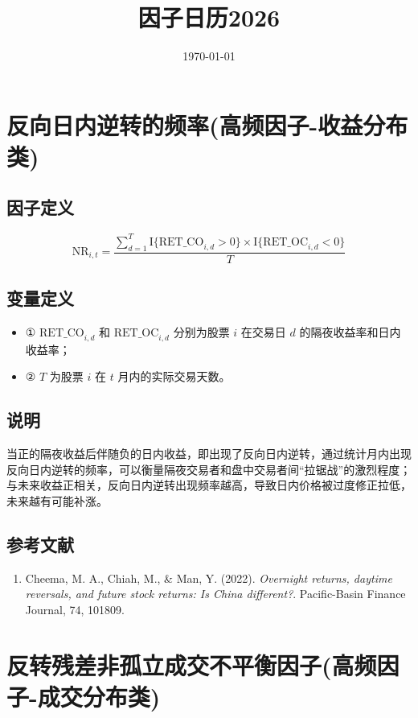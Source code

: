 \documentclass{article}
\title{因子日历2026}
\date{\today}
\begin{document}
\maketitle

\section{反向日内逆转的频率(高频因子-收益分布类)}

\subsection{因子定义}
\begin{equation}
    \mathrm{NR}_{i,t} = \frac{\sum_{d=1}^{T} \mathrm{I}\{\mathrm{RET\_CO}_{i,d}>0\} \times \mathrm{I}\{\mathrm{RET\_OC}_{i,d}<0\}}{T}
\end{equation}

\subsection{变量定义}
\begin{itemize}
    \item ① \( \mathrm{RET\_CO}_{i,d} \) 和 \( \mathrm{RET\_OC}_{i,d} \) 分别为股票 \( i \) 在交易日 \( d \) 的隔夜收益率和日内收益率；
    \item ② \( T \) 为股票 \( i \) 在 \( t \) 月内的实际交易天数。
\end{itemize}

\subsection{说明}
当正的隔夜收益后伴随负的日内收益，即出现了反向日内逆转，通过统计月内出现反向日内逆转的频率，可以衡量隔夜交易者和盘中交易者间“拉锯战”的激烈程度；与未来收益正相关，反向日内逆转出现频率越高，导致日内价格被过度修正拉低，未来越有可能补涨。

\subsection{参考文献}
\begin{enumerate}
    \item Cheema, M. A., Chiah, M., \& Man, Y. (2022). \textit{Overnight returns, daytime reversals, and future stock returns: Is China different?}. Pacific-Basin Finance Journal, 74, 101809.
\end{enumerate}

\section{反转残差非孤立成交不平衡因子(高频因子-成交分布类)}
\end{document}
